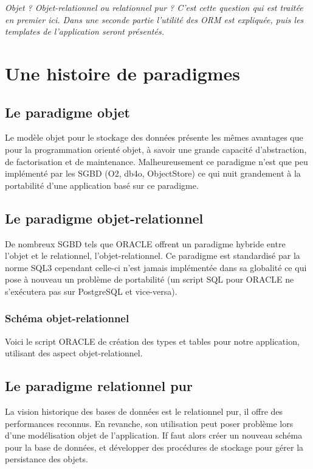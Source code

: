 \textit{Objet ? Objet-relationnel ou relationnel pur ? C'est cette question qui est traitée en premier ici. Dans une seconde partie l'utilité des ORM est expliquée, puis les templates de l'application seront présentés.}

\section{Une histoire de paradigmes}
\subsection{Le paradigme objet}

Le modèle objet pour le stockage des données présente les mêmes avantages que pour la programmation orienté objet, à savoir une grande capacité d'abstraction, de factorisation et de maintenance. Malheureusement ce paradigme n'est que peu implémenté par les SGBD (O2, db4o, ObjectStore) ce qui nuit grandement à la portabilité d'une application basé sur ce paradigme.

\subsection{Le paradigme objet-relationnel}

De nombreux SGBD tels que ORACLE offrent un paradigme hybride entre l'objet et le relationnel, l'objet-relationnel.
Ce paradigme est standardisé par la norme SQL3 cependant celle-ci n'est jamais implémentée dans sa globalité ce qui pose à nouveau un problème de portabilité (un script SQL pour ORACLE ne s'exécutera pas sur PostgreSQL et vice-versa).

\subsubsection{Schéma objet-relationnel}

Voici le script ORACLE de création des types et tables pour notre application, utilisant des aspect objet-relationnel.


\subsection{Le paradigme relationnel pur}

La vision historique des bases de données est le relationnel pur, il offre des performances reconnus. En revanche, son utilisation peut poser problème lors d'une modélisation objet de l'application. If faut alors créer un nouveau schéma pour la base de données, et développer des procédures de stockage pour gérer la persistance des objets.

